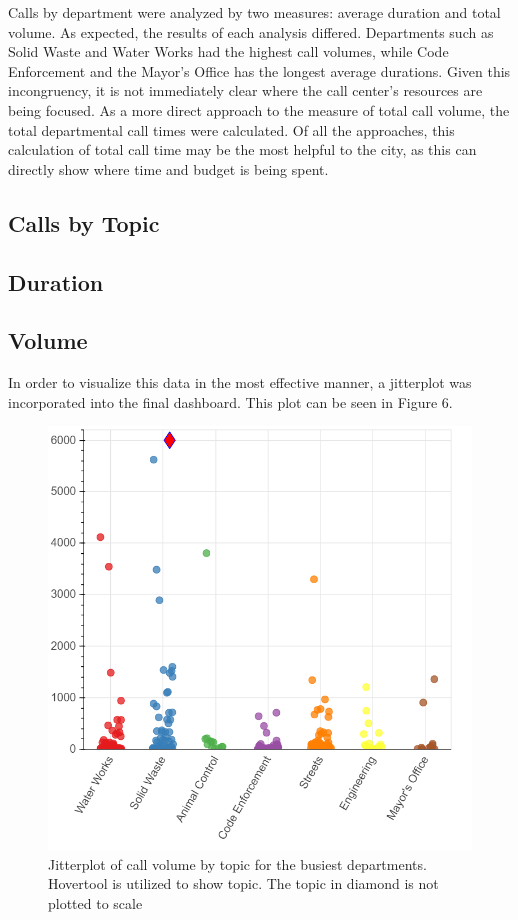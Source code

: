 \documentclass[11pt,twocolumn]{article}
\begin{document}
Calls by department were analyzed by two measures:  average duration and total volume.  As expected, the results of each analysis differed.  Departments such as Solid Waste and Water Works had the highest call volumes, while Code Enforcement and the Mayor's Office has the longest average durations.  Given this incongruency, it is not immediately clear where the call center's resources are being focused.  As a more direct approach to the measure of total call volume, the total departmental call times were calculated.  Of all the approaches, this calculation of total call time may be the most helpful to the city, as this can directly show where time and budget is being spent.


	\subsection{Calls by Topic}

\subsection{Duration}

\subsection{Volume}

In order to visualize this data in the most effective manner, a jitterplot was incorporated into the final dashboard.  This plot can be seen in Figure 6.

\begin{figure}[h]
  \includegraphics[scale=0.25]{jitterplot.png}
  \caption{Jitterplot of call volume by topic for the busiest departments.  Hovertool is utilized to show topic.  The topic in diamond is not plotted to scale}
\end{figure}
\end{document}
